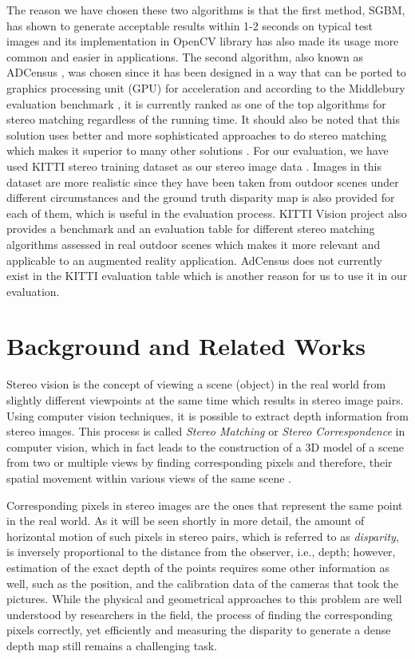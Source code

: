 \documentclass[12pt]{report}
\begin{document}
The reason we have chosen these two algorithms is that the first method, SGBM, has shown to generate acceptable results within 1-2 seconds on typical test images \cite{hir08} and 
its implementation in OpenCV library has also made its usage more common and easier in applications. The second algorithm, also known as ADCensus \cite{mei11}, was chosen since 
it has been designed in a way that
can be ported to graphics processing unit (GPU) for acceleration and according to the Middlebury evaluation benchmark \cite{mideval}, it is currently ranked as one of the top algorithms for 
stereo matching regardless of the running time.
It should also be noted that this solution uses better and more sophisticated approaches to do stereo matching which makes it superior to many other solutions \cite{mideval}. \newline
For our evaluation, we have used KITTI stereo training dataset as our stereo image data \cite{kitti}. 
Images in this dataset are more realistic since they have been taken from outdoor scenes under different circumstances 
and the ground truth disparity map is also provided for each of them, which is useful in the evaluation process. KITTI Vision project also provides a benchmark and an evaluation table
for different stereo
matching algorithms assessed in real outdoor scenes which makes it more relevant and applicable to an augmented reality application. 
AdCensus does not currently exist in the KITTI evaluation table which is another reason for us to use it in our evaluation.


\chapter{Background and Related Works}
Stereo vision is the concept of viewing a scene (object) in the real world from slightly different
viewpoints at the same time which results in stereo image pairs. Using computer vision techniques, it is possible to extract depth information from stereo
images. This process is called {\it Stereo Matching} or {\it Stereo Correspondence} in computer vision,
which in fact leads to the construction of a
3D model of a scene from two or multiple views by finding corresponding pixels and therefore, their spatial movement within various views of the same scene \cite{sze11}.

Corresponding pixels in stereo images are the ones that represent the same point in the real
world. As it will be seen shortly in more detail, the amount of horizontal motion of such pixels
in stereo pairs, which is referred to as {\it disparity}, is inversely proportional to the
distance from the observer, i.e., depth; however,  estimation of the exact depth of the points requires some
other information as well, such as the position, and the calibration data of the cameras that took the pictures.
While the physical and geometrical approaches to this problem are well understood by researchers in the field, the process of finding the corresponding pixels correctly, yet efficiently
and measuring the disparity to generate a dense depth map still remains a challenging task. \newline
\end{document}
